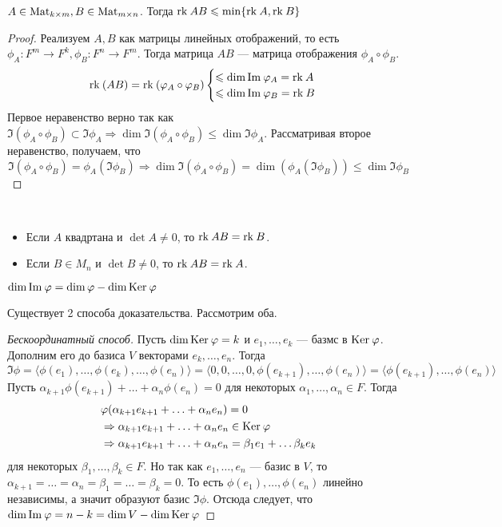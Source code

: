 \begin{Consequence}
    $A \in \mathrm{Mat}_{k\times m}, B\in \mathrm{Mat}_{m\times n}$. Тогда $\mathrm{rk}\: AB \leqslant \min\{\mathrm{rk}\: A, \mathrm{rk}\: B\}$
\end{Consequence}
\begin{proof}
    Реализуем $A, B$ как матрицы линейных отображений, то есть $\phi_A\colon F^m \rightarrow F^k, \phi_B\colon F^n \rightarrow F^m$. Тогда матрица $AB$ --- матрица отображения $\phi_A \circ \phi_B$.
    \[
        \mathrm{rk}\:(AB) = \mathrm{rk}\: (\varphi_A\circ\varphi_B)
        \begin{cases}
            \leqslant \dim \mathrm{Im\:} \varphi_A = \mathrm{rk}\: A \\
            \leqslant \dim \mathrm{Im\:} \varphi_B = \mathrm{rk}\: B 

        \end{cases}
    \]
Первое неравенство верно так как $\Im(\phi_A\circ \phi_B) \subset \Im \phi_A \Rightarrow \dim \Im (\phi_A\circ \phi_B) \leqslant \dim \Im \phi_A$. Рассматривая второе неравенство, получаем, что 
    \[
        \Im (\phi_A\circ \phi_B) = \phi_A(\Im \phi_B) \Rightarrow \dim \Im (\phi_A\circ \phi_B)= \dim(\phi_A(\Im\phi_B)) \leqslant \dim\Im \phi_B
    \]
\end{proof}
\begin{Task}
    \ 
    \begin{itemize}
        \item Если $A$ квадртана и $\det A \neq 0$, то $\mathrm{rk}\: AB = \mathrm{rk}\: B$.
        \item Если $B \in M_n$ и $\det B \neq 0$, то $\mathrm{rk}\: AB = \mathrm{rk}\: A$.
    \end{itemize}
\end{Task}
\begin{Theorem}
    $\dim \mathrm{Im\:} \varphi = \dim \varphi - \dim \mathrm{Ker}\: \varphi$
\end{Theorem}
Существует 2 способа доказательства. Рассмотрим оба.
\begin{proof}[Бескоординатный способ]
     Пусть $\dim \mathrm{Ker}\: \varphi = k$ и $e_1, \ldots, e_k$ --- базмс в $\mathrm{Ker}\: \varphi$. Дополним его до базиса $V$ векторами $e_k, \ldots, e_n$. Тогда
    \[
        \Im \phi = \langle\phi(e_1), \ldots, \phi(e_k), \ldots, \phi(e_n)\rangle = \langle0, 0, \ldots, 0, \phi(e_{k+1}), \ldots, \phi(e_n)\rangle = \langle\phi(e_{k+1}), \ldots, \phi(e_{n})\rangle
    \]
Пусть $\alpha_{k+1}\phi(e_{k+1}) + \ldots + \alpha_n\phi(e_n) = 0$ для некоторых $\alpha_1, \ldots, \alpha_n \in F$. Тогда 
\begin{align*}
    &\varphi(\alpha_{k+1}e_{k+1} + \ldots + \alpha_ne_n) = 0 \\
    &\Rightarrow \alpha_{k+1}e_{k+1} + \ldots + \alpha_ne_n \in \mathrm{Ker}\: \varphi \\
    &\Rightarrow \alpha_{k+1}e_{k+1} + \ldots + \alpha_ne_n = \beta_1e_1 + \ldots \beta_ke_k
\end{align*}
для некоторых $\beta_1, \ldots, \beta_k \in F$. Но так как $e_1, \ldots, e_n$ --- базис в $V$, то $\alpha_{k+1} =  \ldots = \alpha_n = \beta_1 = \ldots = \beta_k = 0$. То есть $\phi(e_1), \ldots, \phi(e_n)$ линейно независимы, а значит образуют базис $\Im \phi$. Отсюда следует, что $\dim\mathrm{Im\:}\varphi = n - k = \dim V - \dim\mathrm{Ker}\:\varphi$
\end{proof}
